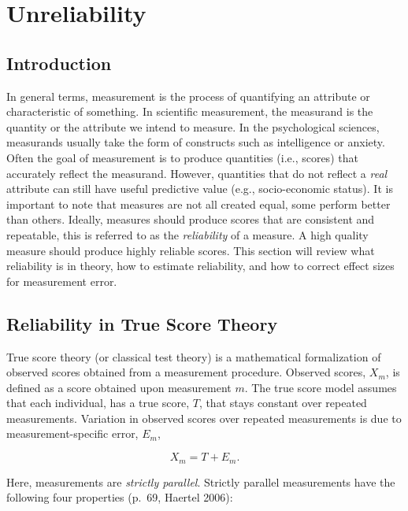 \documentclass[
  letterpaper,
  DIV=11,
  numbers=noendperiod]{scrreprt}
\begin{document}

\chapter{Unreliability}\label{unreliability}

\section{Introduction}\label{introduction-2}

In general terms, measurement is the process of quantifying an attribute
or characteristic of something. In scientific measurement, the measurand
is the quantity or the attribute we intend to measure. In the
psychological sciences, measurands usually take the form of constructs
such as intelligence or anxiety. Often the goal of measurement is to
produce quantities (i.e., scores) that accurately reflect the measurand.
However, quantities that do not reflect a \emph{real} attribute can
still have useful predictive value (e.g., socio-economic status). It is
important to note that measures are not all created equal, some perform
better than others. Ideally, measures should produce scores that are
consistent and repeatable, this is referred to as the \emph{reliability}
of a measure. A high quality measure should produce highly reliable
scores. This section will review what reliability is in theory, how to
estimate reliability, and how to correct effect sizes for measurement
error.

\section{Reliability in True Score Theory}\label{sec-true-score-theory}

True score theory (or classical test theory) is a mathematical
formalization of observed scores obtained from a measurement procedure.
Observed scores, \(X_m\), is defined as a score obtained upon
measurement \(m\). The true score model assumes that each individual,
has a true score, \(T\), that stays constant over repeated measurements.
Variation in observed scores over repeated measurements is due to
measurement-specific error, \(E_{m}\),

\[
X_{m} = T+E_{m}.
\]

Here, measurements are \emph{strictly parallel}. Strictly parallel
measurements have the following four properties (p.~69, Haertel 2006):
\end{document}
